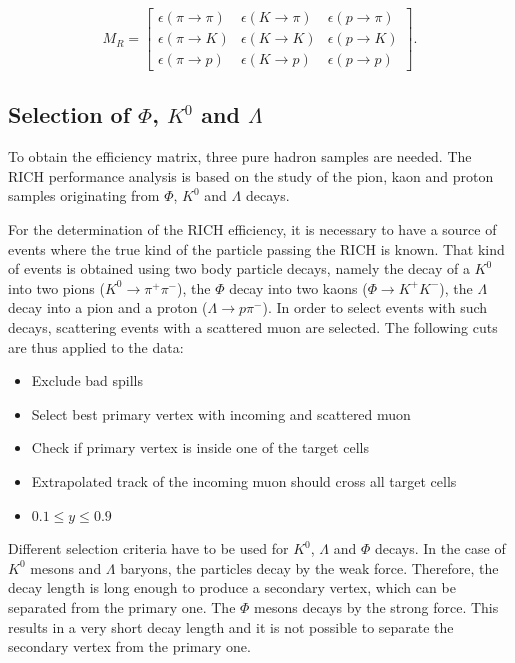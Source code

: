 \begin{equation}
  M_R
  =
  \begin{bmatrix}
  \epsilon(\pi \rightarrow \pi) & \epsilon(K \rightarrow \pi) & \epsilon(p \rightarrow \pi)\\
  \epsilon(\pi \rightarrow K) & \epsilon(K \rightarrow K) & \epsilon(p \rightarrow K) \\
  \epsilon(\pi \rightarrow p) & \epsilon(K \rightarrow p) & \epsilon(p \rightarrow p)
  \end{bmatrix}.
\end{equation}

\subsection{Selection of $\Phi$, $K^0$ and $\Lambda$}

To obtain the efficiency matrix, three pure hadron samples are needed. The RICH performance analysis is based on the study of the pion, kaon and proton samples originating from $\Phi$, $K^0$ and $\Lambda$ decays.

For the determination of the RICH efficiency, it is necessary to have a source of events where the true kind of the particle passing the RICH is known. That kind of events is obtained using two body particle decays, namely the decay of a $K^0$ into two pions ($K^0 \rightarrow \pi^+\pi^-$), the $\Phi$ decay into two kaons ($\Phi \rightarrow K^+K^-$), the $\Lambda$ decay into a pion and a proton ($\Lambda \rightarrow p\pi^-$). In order to select events with such decays, scattering events with a scattered muon are selected. The following cuts are thus applied to the data:
\begin{itemize}
  \item Exclude bad spills
  \item Select best primary vertex with incoming and scattered muon
  \item Check if primary vertex is inside one of the target cells
  \item Extrapolated track of the incoming muon should cross all target cells
  \item $0.1 \le y \le 0.9$
\end{itemize}

Different selection criteria have to be used for $K^0$, $\Lambda$ and $\Phi$ decays. In the case of $K^0$ mesons and $\Lambda$ baryons, the particles decay by the weak force. Therefore, the decay length is long enough to produce a secondary vertex, which can be separated from the primary one. The $\Phi$ mesons decays by the strong force. This results in a very short decay length and it is not possible to separate the secondary vertex from the primary one.

